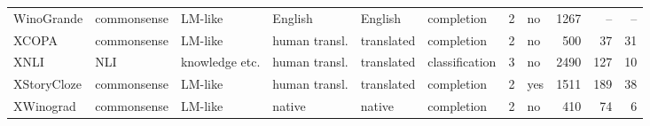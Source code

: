 \begin{tabular}{llllllllrrr}
WinoGrande & commonsense & LM-like & English & English & completion & 2 & no & 1267 & -- & -- \\
XCOPA & commonsense & LM-like & human transl. & translated & completion & 2 & no & 500 & 37 & 31 \\
XNLI & NLI & knowledge etc. & human transl. & translated & classification & 3 & no & 2490 & 127 & 10 \\
XStoryCloze & commonsense & LM-like & human transl. & translated & completion & 2 & yes & 1511 & 189 & 38 \\
XWinograd & commonsense & LM-like & native & native & completion & 2 & no & 410 & 74 & 6 \\
\bottomrule
\end{tabular}

